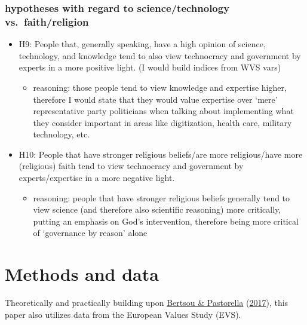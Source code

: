 \documentclass[
  12pt,
  english,
]{article}
\providecommand{\tightlist}{%
  \setlength{\itemsep}{0pt}\setlength{\parskip}{0pt}}
\begin{document}
\hypertarget{hypotheses-with-regard-to-sciencetechnology-vs.-faithreligion}{%
\subsubsection{hypotheses with regard to science/technology
vs.~faith/religion}\label{hypotheses-with-regard-to-sciencetechnology-vs.-faithreligion}}

\begin{itemize}
\tightlist
\item
  H9: People that, generally speaking, have a high opinion of science,
  technology, and knowledge tend to also view technocracy and government
  by experts in a more positive light. (I would build indices from WVS
  vars)

  \begin{itemize}
  \tightlist
  \item
    reasoning: those people tend to view knowledge and expertise higher,
    therefore I would state that they would value expertise over `mere'
    representative party politicians when talking about implementing
    what they consider important in areas like digitization, health
    care, military technology, etc.
  \end{itemize}
\item
  H10: People that have stronger religious beliefs/are more
  religious/have more (religious) faith tend to view technocracy and
  government by experts/expertise in a more negative light.

  \begin{itemize}
  \tightlist
  \item
    reasoning: people that have stronger religious beliefs generally
    tend to view science (and therefore also scientific reasoning) more
    critically, putting an emphasis on God's intervention, therefore
    being more critical of `governance by reason' alone
  \end{itemize}
\end{itemize}

\hypertarget{methods-and-data}{%
\section{Methods and data}\label{methods-and-data}}

Theoretically and practically building upon
\protect\hyperlink{ref-bertsou2017technocratic}{Bertsou \& Pastorella}
(\protect\hyperlink{ref-bertsou2017technocratic}{2017}), this paper also
utilizes data from the European Values Study (EVS).
\end{document}

